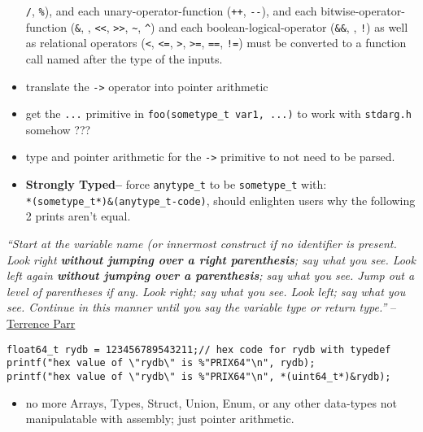 \begin{itemize}
  \texttt{/}, \texttt{\%}), and each unary-operator-function
  (\texttt{++}, \texttt{-\/-}), and each bitwise-operator-function
  (\texttt{\&}, \texttt{\textbar{}}, \texttt{\textless{}\textless{}},
  \texttt{\textgreater{}\textgreater{}}, \texttt{\textasciitilde{}},
  \texttt{\^{}}) and each boolean-logical-operator (\texttt{\&\&},
  \texttt{\textbar{}\textbar{}}, \texttt{!}) as well as relational
  operators (\texttt{\textless{}}, \texttt{\textless{}=},
  \texttt{\textgreater{}}, \texttt{\textgreater{}=}, \texttt{==},
  \texttt{!=}) must be converted to a function call named after the type
  of the inputs.
\item
  translate the \texttt{-\textgreater{}} operator into pointer
  arithmetic
\item
  get the \texttt{...} primitive in
  \texttt{foo(sometype\_t\ var1,\ ...)} to work with \texttt{stdarg.h}
  somehow ???
\item
  type and pointer arithmetic for the \texttt{-\textgreater{}} primitive
  to not need to be parsed.
\item
  \textbf{Strongly Typed--} force \texttt{anytype\_t} to be
  \texttt{sometype\_t} with:\\
  \texttt{*(sometype\_t*)\&(anytype\_t-code)}, should enlighten users
  why the following 2 prints aren't equal.
\end{itemize}

\emph{``Start at the variable name (or innermost construct if no
identifier is present. Look right \textbf{without jumping over a right
parenthesis}; say what you see. Look left again \textbf{without jumping
over a parenthesis}; say what you see. Jump out a level of parentheses
if any. Look right; say what you see. Look left; say what you see.
Continue in this manner until you say the variable type or return
type.''}
--\href{https://parrt.cs.usfca.edu/doc/how-to-read-C-declarations.html}{Terrence
Parr}

\begin{verbatim}
float64_t rydb = 123456789543211;// hex code for rydb with typedef
printf("hex value of \"rydb\" is %"PRIX64"\n", rydb);
printf("hex value of \"rydb\" is %"PRIX64"\n", *(uint64_t*)&rydb);
\end{verbatim}

\begin{itemize}
\tightlist
\item
  no more Arrays, Types, Struct, Union, Enum, or any other data-types
  not manipulatable with assembly; just pointer arithmetic.
\end{itemize}

